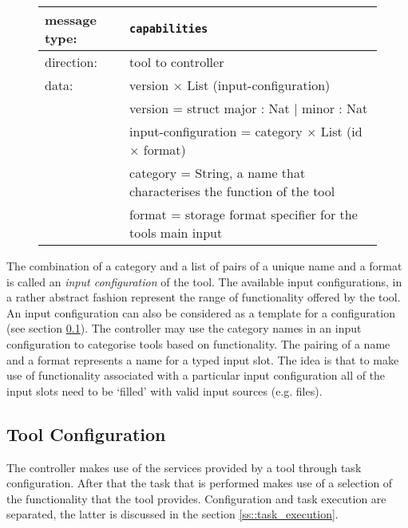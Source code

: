 \documentclass{article}
\newcommand{\msg}[1]{\texttt{#1}}
\begin{document}
   \begin{figure}[H]
    \begin{center}
     \begin{tabular}{|ll|}
      \hline
       message type:   & \msg{capabilities} \\
      \hline
       direction:      & tool to controller \\
       data:           & version $\times$ List (input-configuration) \\
                       &  version             = struct major : Nat $|$ minor : Nat \\
                       &  input-configuration = category $\times$ List (id $\times$ format) \\
                       &  category            = String,   a name that characterises the function of the tool \\
                       &  format              = storage format specifier for the tools main input \\
      \hline
     \end{tabular}
    \end{center}
   \end{figure}

   \noindent The combination of a category and a list of pairs of a unique name and a
   format is called an \textit{input configuration} of the tool.  The available
   input configurations, in a rather abstract fashion represent the range of
   functionality offered by the tool.  An input configuration can also be
   considered as a template for a configuration (see section
   \ref{ss::tool_configuration}). The controller may use the category names
   in an input configuration to categorise tools based on functionality. The
   pairing of a name and a format represents a name for a typed input slot. The
   idea is that to make use of functionality associated with a particular input
   configuration all of the input slots need to be `filled' with valid input
   sources (e.g. files).

  \subsection{Tool Configuration} \label{ss::tool_configuration}

   The controller makes use of the services provided by a tool through task
   configuration. After that the task that is performed makes use of a
   selection of the functionality that the tool provides.  Configuration and
   task execution are separated, the latter is discussed in the section
   \ref{ss::task_execution}.
\end{document}
